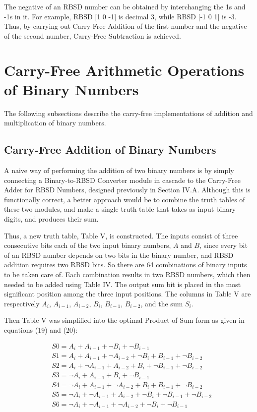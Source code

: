 \documentclass[conference]{IEEEtran_IBSS}
\begin{document}
The negative of an RBSD number can be obtained by interchanging the 1s and -1s in it. For example, RBSD [1 0 -1] is decimal 3, while RBSD [-1 0 1] is -3. Thus, by carrying out Carry-Free Addition of the first number and the negative of the second number, Carry-Free Subtraction is achieved.

\section{Carry-Free Arithmetic Operations of Binary Numbers}

The following subsections describe the carry-free implementations of addition and multiplication of binary numbers.

\subsection{Carry-Free Addition of Binary Numbers}

A naive way of performing the addition of two binary numbers is by simply connecting a Binary-to-RBSD Converter module in cascade to the Carry-Free Adder for RBSD Numbers, designed previously in Section IV.A. Although this is functionally correct, a better approach would be to combine the truth tables of these two modules, and make a single truth table that takes as input binary digits, and produces their sum.

Thus, a new truth table, Table V, is constructed. The inputs consist of three consecutive bits each of the two input binary numbers, $A$ and $B$, since every bit of an RBSD number depends on two bits in the binary number, and RBSD addition requires two RBSD bits. So there are 64 combinations of binary inputs to be taken care of. Each combination results in two RBSD numbers, which then needed to be added using Table IV. The output sum bit is placed in the most significant position among the three input positions. The columns in Table V are respectively $A_{i}$, $A_{i-1}$, $A_{i-2}$, $B_{i}$, $B_{i-1}$, $B_{i-2}$, and the sum $S_{i}$.

Then Table V was simplified into the optimal Product-of-Sum form as given in equations (19) and (20):

\vspace{-1em}
\begin{align}
&S0 = A_{i} + A_{i-1} + \neg  B_{i} + \neg B_{i-1}\\
&S1 = A_{i} + A_{i-1} + \neg A_{i-2} + \neg B_{i} + B_{i-1} + \neg B_{i-2}\\
&S2 = A_{i} + \neg A_{i-1} + A_{i-2} + B_{i} + \neg B_{i-1} + \neg B_{i-2}\\
&S3 = \neg A_{i} + A_{i-1}   + B_{i} + \neg B_{i-1}\\
&S4 = \neg A_{i} + A_{i-1} + \neg A_{i-2} + B_{i} + B_{i-1} + \neg B_{i-2}\\
&S5 = \neg A_{i} + \neg A_{i-1} + A_{i-2} + \neg B_{i} + \neg B_{i-1} + \neg B_{i-2}\\
&S6 = \neg A_{i} + \neg A_{i-1} + \neg A_{i-2} + \neg B_{i} + \neg B_{i-1}
\end{align}
\end{document}
